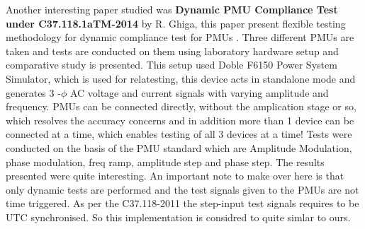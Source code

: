 Another interesting paper studied was \textbf{Dynamic PMU Compliance Test under C37.118.1aTM-2014} by R. Ghiga, this paper present flexible testing methodology for dynamic compliance test for PMUs \cite{Paper:ghiga}. Three different PMUs are taken and tests are conducted on them using laboratory hardware setup and comparative study is presented. This setup used Doble F6150 Power System Simulator, which is used for relatesting, this device acts in standalone mode and generates 3 -$\phi$ AC voltage and current signals with varying amplitude and frequency. PMUs can be connected directly, without the amplication stage or so, which resolves the accuracy concerns and in addition more than 1 device can be connected at a time, which enables testing of all 3 devices at a time! Tests were conducted on the basis of the PMU standard which are Amplitude Modulation, phase modulation, freq ramp, amplitude step and phase step. The results presented were quite interesting. An important note to make over here is that only dynamic tests are performed and the test signals given to the PMUs are not time triggered. As per the C37.118-2011 the step-input test signals requires to be UTC synchronised. So this implementation is considred to quite simlar to ours.